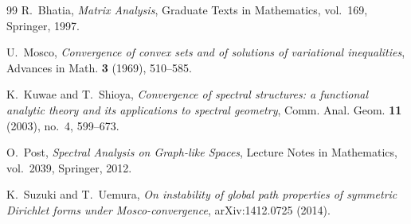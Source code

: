 \documentclass[11pt]{amsart}
\theoremstyle{definition}
\theoremstyle{remark}
\begin{document}
\begin{thebibliography}{99}
R.~Bhatia,
\emph{Matrix Analysis},
Graduate Texts in Mathematics, vol.~169, Springer, 1997.

U.~Mosco,
\emph{Convergence of convex sets and of solutions of variational
inequalities},
Advances in Math. \textbf{3} (1969), 510--585.

K.~Kuwae and T.~Shioya,
\emph{Convergence of spectral structures: a functional analytic theory
and its applications to spectral geometry},
Comm. Anal. Geom. \textbf{11} (2003), no.~4, 599--673.

O.~Post,
\emph{Spectral Analysis on Graph-like Spaces},
Lecture Notes in Mathematics, vol.~2039, Springer, 2012.

K.~Suzuki and T.~Uemura,
\emph{On instability of global path properties of symmetric Dirichlet
forms under Mosco-convergence},
arXiv:1412.0725 (2014).

\end{thebibliography}
\end{document}

